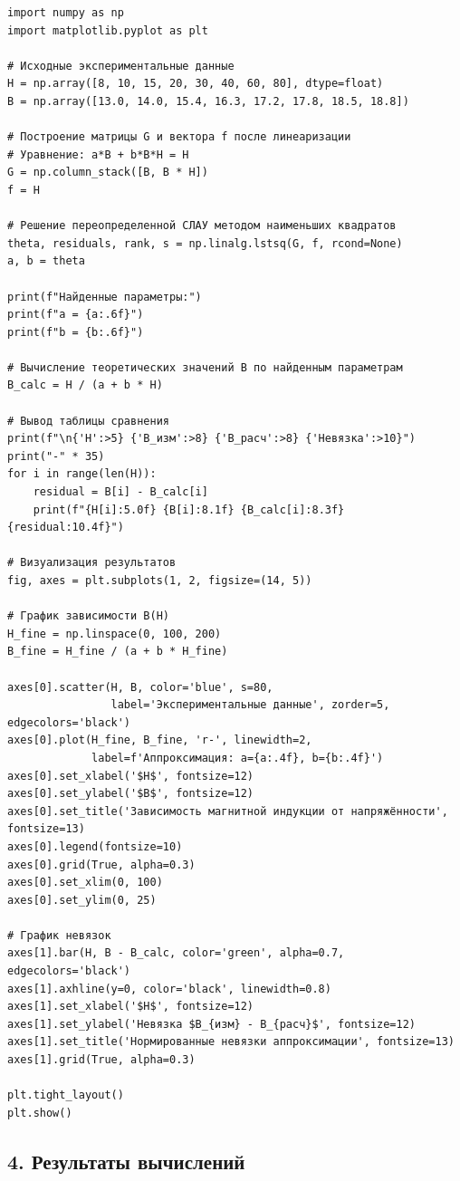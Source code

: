 \documentclass{article}
\begin{document}
\begin{verbatim}
import numpy as np
import matplotlib.pyplot as plt

# Исходные экспериментальные данные
H = np.array([8, 10, 15, 20, 30, 40, 60, 80], dtype=float)
B = np.array([13.0, 14.0, 15.4, 16.3, 17.2, 17.8, 18.5, 18.8])

# Построение матрицы G и вектора f после линеаризации
# Уравнение: a*B + b*B*H = H
G = np.column_stack([B, B * H])
f = H

# Решение переопределенной СЛАУ методом наименьших квадратов
theta, residuals, rank, s = np.linalg.lstsq(G, f, rcond=None)
a, b = theta

print(f"Найденные параметры:")
print(f"a = {a:.6f}")
print(f"b = {b:.6f}")

# Вычисление теоретических значений B по найденным параметрам
B_calc = H / (a + b * H)

# Вывод таблицы сравнения
print(f"\n{'H':>5} {'B_изм':>8} {'B_расч':>8} {'Невязка':>10}")
print("-" * 35)
for i in range(len(H)):
    residual = B[i] - B_calc[i]
    print(f"{H[i]:5.0f} {B[i]:8.1f} {B_calc[i]:8.3f} {residual:10.4f}")

# Визуализация результатов
fig, axes = plt.subplots(1, 2, figsize=(14, 5))

# График зависимости B(H)
H_fine = np.linspace(0, 100, 200)
B_fine = H_fine / (a + b * H_fine)

axes[0].scatter(H, B, color='blue', s=80, 
                label='Экспериментальные данные', zorder=5, edgecolors='black')
axes[0].plot(H_fine, B_fine, 'r-', linewidth=2, 
             label=f'Аппроксимация: a={a:.4f}, b={b:.4f}')
axes[0].set_xlabel('$H$', fontsize=12)
axes[0].set_ylabel('$B$', fontsize=12)
axes[0].set_title('Зависимость магнитной индукции от напряжённости', fontsize=13)
axes[0].legend(fontsize=10)
axes[0].grid(True, alpha=0.3)
axes[0].set_xlim(0, 100)
axes[0].set_ylim(0, 25)

# График невязок
axes[1].bar(H, B - B_calc, color='green', alpha=0.7, edgecolors='black')
axes[1].axhline(y=0, color='black', linewidth=0.8)
axes[1].set_xlabel('$H$', fontsize=12)
axes[1].set_ylabel('Невязка $B_{изм} - B_{расч}$', fontsize=12)
axes[1].set_title('Нормированные невязки аппроксимации', fontsize=13)
axes[1].grid(True, alpha=0.3)

plt.tight_layout()
plt.show()
\end{verbatim}

\subsection*{4. Результаты вычислений}
\end{document}
